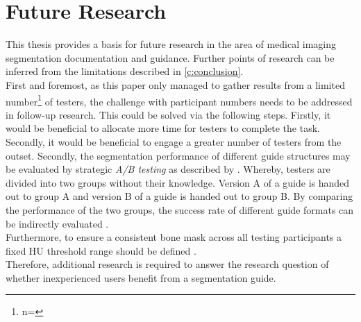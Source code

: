 \section*{Future Research}\label{c:future}
This thesis provides a basis for future research in the area of medical imaging segmentation documentation and guidance.
Further points of research can be inferred from the limitations described in \cref{c:conclusion}.\\
First and foremost, as this paper only managed to gather results from a limited number\footnote{n=\numberofTesters} of testers,
the challenge with participant numbers needs to be addressed in follow-up research.
This could be solved via the following steps.
Firstly, it would be beneficial to allocate more time for testers to complete the task.
Secondly, it would be beneficial to engage a greater number of testers from the outset.
Secondly, the segmentation performance of different guide structures may be evaluated by strategic \textit{A/B testing} as
described by \citeauthor{brataUserExperienceImprovement2020} \cite{brataUserExperienceImprovement2020}.
Whereby, testers are divided into two groups without their knowledge.
Version A of a guide is handed out to group A and version B of a guide is handed out to group B.
By comparing the performance of the two groups, the success rate of different guide formats can be indirectly evaluated \cite{brataUserExperienceImprovement2020}.\\
Furthermore, to ensure a consistent bone mask across all testing participants a fixed HU threshold range should be defined \cite{chavezGuidelinesMicroComputed2021}.\\
Therefore, additional research is required to answer the research question of whether inexperienced users benefit from a segmentation guide.

